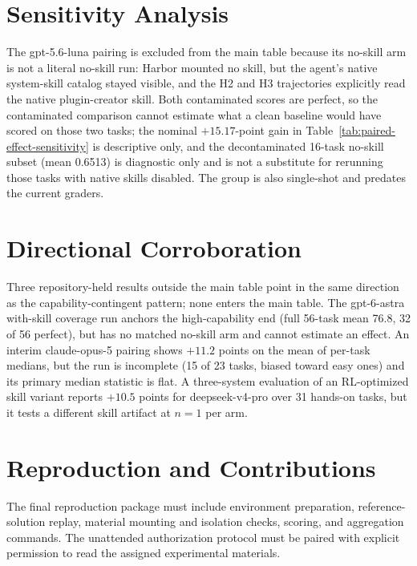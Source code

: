 \documentclass[11pt]{article}
\begin{document}
\section{Sensitivity Analysis}
\label{app:sensitivity}
The gpt-5.6-luna pairing is excluded from the main table because its no-skill arm is not a literal no-skill run: Harbor mounted no skill, but the agent's native system-skill catalog stayed visible, and the H2 and H3 trajectories explicitly read the native plugin-creator skill.
Both contaminated scores are perfect, so the contaminated comparison cannot estimate what a clean baseline would have scored on those two tasks; the nominal $+15.17$-point gain in Table~\ref{tab:paired-effect-sensitivity} is descriptive only, and the decontaminated 16-task no-skill subset (mean 0.6513) is diagnostic only and is not a substitute for rerunning those tasks with native skills disabled.
The group is also single-shot and predates the current graders.


\section{Directional Corroboration}
\label{app:corroboration}
Three repository-held results outside the main table point in the same direction as the capability-contingent pattern; none enters the main table.
The gpt-6-astra with-skill coverage run anchors the high-capability end (full 56-task mean 76.8, 32 of 56 perfect), but has no matched no-skill arm and cannot estimate an effect.
An interim claude-opus-5 pairing shows $+11.2$ points on the mean of per-task medians, but the run is incomplete (15 of 23 tasks, biased toward easy ones) and its primary median statistic is flat.
A three-system evaluation of an RL-optimized skill variant reports $+10.5$ points for deepseek-v4-pro over 31 hands-on tasks, but it tests a different skill artifact at $n = 1$ per arm.

\section{Reproduction and Contributions}
\label{app:repro}
\label{app:contrib}
The final reproduction package must include environment preparation, reference-solution replay, material mounting and isolation checks, scoring, and aggregation commands.
The unattended authorization protocol must be paired with explicit permission to read the assigned experimental materials.
\end{document}
